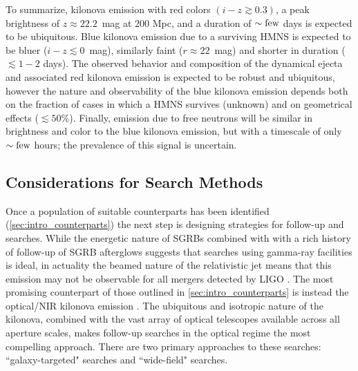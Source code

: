 To summarize, kilonova emission with red colors $(i-z\gtrsim 0.3)$, a peak brightness of $z\approx22.2$~mag at 200 Mpc, and a duration of $\sim \rm few$ days is expected to be ubiquitous. Blue kilonova emission due to a surviving HMNS is expected to be bluer ($i-z \lesssim 0$~mag), similarly faint ($r \approx 22$~mag) and shorter in duration ($\lesssim 1-2$ days). The observed behavior and composition of the dynamical ejecta and associated red kilonova emission is expected to be robust and ubiquitous, however the nature and observability of the blue kilonova emission depends both on the fraction of cases in which a HMNS survives (unknown) and on geometrical effects ($\lesssim 50\%$).  Finally, emission due to free neutrons will be similar in brightness and color to the blue kilonova emission, but with a timescale of only $\sim \rm few$ hours; the prevalence of this signal is uncertain.

\subsection{Considerations for Search Methods}
\label{sec:intro_searchmethods}
Once a population of suitable counterparts has been identified (\cref{sec:intro_counterparts}) the next step is designing strategies for follow-up and searches. While the energetic nature of SGRBs combined with with a rich history of follow-up of SGRB afterglows \citep[see e.g.,][for a review]{Berger2014} suggests that searches using gamma-ray facilities is ideal, in actuality the beamed nature of the relativistic jet means that this emission may not be observable for all mergers detected by LIGO \citep{ChenHolz13}. The most promising counterpart of those outlined in \cref{sec:intro_counterparts} is instead the optical/NIR kilonova emission \citep{MetzgerBerger12}. The ubiquitous and isotropic nature of the kilonova, combined with the vast array of optical telescopes available across all aperture scales, makes follow-up searches in the optical regime the most compelling approach. There are two primary approaches to these searches: ``galaxy-targeted" searches and ``wide-field" searches.

